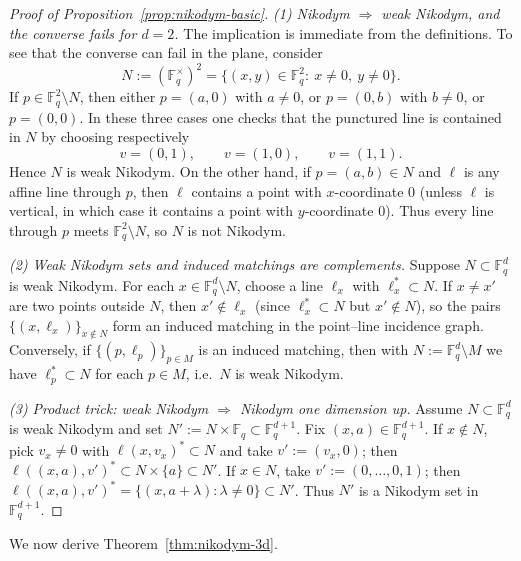 \documentclass[12pt,reqno]{amsart}
\theoremstyle{plain}
\theoremstyle{definition}
\newcommand{\F}{\mathbb{F}}
\newcommand{\1}{\mathbf{1}}
\begin{document}
\begin{proof}[Proof of Proposition~\ref{prop:nikodym-basic}]
\emph{(1) Nikodym $\Rightarrow$ weak Nikodym, and the converse fails for $d=2$.}
The implication is immediate from the definitions.
To see that the converse can fail in the plane, consider
\[
  N:=(\F_q^\times)^2=\{(x,y)\in\F_q^2:\ x\neq 0,\ y\neq 0\}.
\]
If $p\in\F_q^2\setminus N$, then either $p=(a,0)$ with $a\neq 0$, or $p=(0,b)$ with $b\neq 0$, or $p=(0,0)$.
In these three cases one checks that the punctured line is contained in $N$ by choosing respectively
\[
  v=(0,1),\qquad v=(1,0),\qquad v=(1,1).
\]
Hence $N$ is weak Nikodym.
On the other hand, if $p=(a,b)\in N$ and $\ell$ is any affine line through $p$, then $\ell$ contains a point with
$x$-coordinate $0$ (unless $\ell$ is vertical, in which case it contains a point with $y$-coordinate $0$).
Thus every line through $p$ meets $\F_q^2\setminus N$, so $N$ is not Nikodym.

\medskip
\emph{(2) Weak Nikodym sets and induced matchings are complements.}
Suppose $N\subset\F_q^d$ is weak Nikodym.
For each $x\in\F_q^d\setminus N$, choose a line $\ell_x$ with $\ell_x^\ast\subset N$.
If $x\neq x'$ are two points outside $N$, then $x'\notin \ell_x$ (since $\ell_x^\ast\subset N$ but $x'\notin N$),
so the pairs $\{(x,\ell_x)\}_{x\notin N}$ form an induced matching in the point--line incidence graph.
Conversely, if $\{(p,\ell_p)\}_{p\in M}$ is an induced matching, then with $N:=\F_q^d\setminus M$ we have
$\ell_p^\ast\subset N$ for each $p\in M$, i.e.\ $N$ is weak Nikodym.

\medskip
\emph{(3) Product trick: weak Nikodym $\Rightarrow$ Nikodym one dimension up.}
Assume $N\subset\F_q^d$ is weak Nikodym and set $N':=N\times \F_q\subset \F_q^{d+1}$.
Fix $(x,a)\in\F_q^{d+1}$.
If $x\notin N$, pick $v_x\neq 0$ with $\ell(x,v_x)^\ast\subset N$ and take $v':=(v_x,0)$; then
$\ell((x,a),v')^\ast\subset N\times\{a\}\subset N'$.
If $x\in N$, take $v':=(0,\dots,0,1)$; then $\ell((x,a),v')^\ast=\{(x,a+\lambda):\lambda\neq 0\}\subset N'$.
Thus $N'$ is a Nikodym set in $\F_q^{d+1}$.
\end{proof}

We now derive Theorem~\ref{thm:nikodym-3d}.
\end{document}
